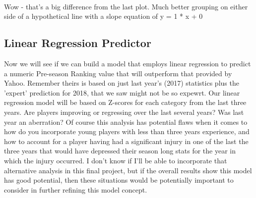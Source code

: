 \documentclass[11pt]{article}
\begin{document}
    \begin{center}
    \end{center}
    { \hspace*{\fill} \\}
    
    Wow - that's a big difference from the last plot. Much better grouping
on either side of a hypothetical line with a slope equation of y = 1 * x
+ 0

    \subsection{Linear Regression
Predictor}\label{linear-regression-predictor}

Now we will see if we can build a model that employs linear regression
to predict a numeric Pre-season Ranking value that will outperform that
provided by Yahoo. Remember theirs is based on just last year's (2017)
statistics plus the 'expert' prediction for 2018, that we saw might not
be so expewrt. Our linear regression model will be based on Z-scores for
each category from the last three years. Are players improving or
regressing over the last several years? Was last year an aberration? Of
course this analysis has potential flaws when it comes to how do you
incorporate young players with less than three years experience, and how
to account for a player having had a significant injury in one of the
last the three years that would have depressed their season long stats
for the year in which the injury occurred. I don't know if I'll be able
to incorporate that alternative analysis in this final project, but if
the overall results show this model has good potential, then these
situations would be potentially important to consider in further
refining this model concept.
\end{document}
